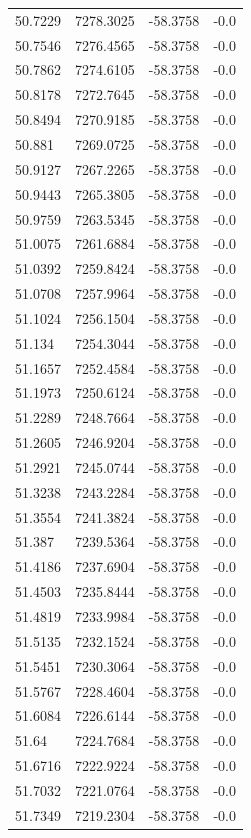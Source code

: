 \begin{table}[H]
\begin{tabular}{llll}
50.7229 & 7278.3025 & -58.3758 & -0.0 \\
50.7546 & 7276.4565 & -58.3758 & -0.0 \\
50.7862 & 7274.6105 & -58.3758 & -0.0 \\
50.8178 & 7272.7645 & -58.3758 & -0.0 \\
50.8494 & 7270.9185 & -58.3758 & -0.0 \\
50.881 & 7269.0725 & -58.3758 & -0.0 \\
50.9127 & 7267.2265 & -58.3758 & -0.0 \\
50.9443 & 7265.3805 & -58.3758 & -0.0 \\
50.9759 & 7263.5345 & -58.3758 & -0.0 \\
51.0075 & 7261.6884 & -58.3758 & -0.0 \\
51.0392 & 7259.8424 & -58.3758 & -0.0 \\
51.0708 & 7257.9964 & -58.3758 & -0.0 \\
51.1024 & 7256.1504 & -58.3758 & -0.0 \\
51.134 & 7254.3044 & -58.3758 & -0.0 \\
51.1657 & 7252.4584 & -58.3758 & -0.0 \\
51.1973 & 7250.6124 & -58.3758 & -0.0 \\
51.2289 & 7248.7664 & -58.3758 & -0.0 \\
51.2605 & 7246.9204 & -58.3758 & -0.0 \\
51.2921 & 7245.0744 & -58.3758 & -0.0 \\
51.3238 & 7243.2284 & -58.3758 & -0.0 \\
51.3554 & 7241.3824 & -58.3758 & -0.0 \\
51.387 & 7239.5364 & -58.3758 & -0.0 \\
51.4186 & 7237.6904 & -58.3758 & -0.0 \\
51.4503 & 7235.8444 & -58.3758 & -0.0 \\
51.4819 & 7233.9984 & -58.3758 & -0.0 \\
51.5135 & 7232.1524 & -58.3758 & -0.0 \\
51.5451 & 7230.3064 & -58.3758 & -0.0 \\
51.5767 & 7228.4604 & -58.3758 & -0.0 \\
51.6084 & 7226.6144 & -58.3758 & -0.0 \\
51.64 & 7224.7684 & -58.3758 & -0.0 \\
51.6716 & 7222.9224 & -58.3758 & -0.0 \\
51.7032 & 7221.0764 & -58.3758 & -0.0 \\
51.7349 & 7219.2304 & -58.3758 & -0.0 \\

\end{tabular}
\end{table}
